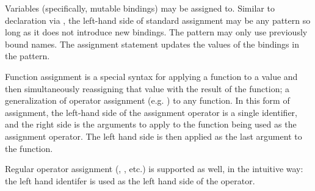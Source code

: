 Variables (specifically, mutable bindings) may be assigned to. Similar to
declaration via , the left-hand side of standard assignment may be
any pattern so long as it does not introduce new bindings. The pattern may only
use previously bound names. The assignment statement updates the values of the
bindings in the pattern.

Function assignment is a special syntax for applying a function to a value and
then simultaneously reassigning that value with the result of the function; a
generalization of operator assignment (e.g. \op{+=}) to any function. In this form
of assignment, the left-hand side of the assignment operator is a single identifier,
and the right side is the arguments to apply to the function being used as the
assignment operator. The left hand side is then applied as the last argument to
the function.

Regular operator assignment (\op{+=}, \op{-=}, etc.) is supported as well, in the
intuitive way: the left hand identifer is used as the left hand side of the operator.

\begin{bnf*}
     \\
     \\
     \\
     \\
     \\
     \\
    \bnfmore{
        \bnfts{|=}\bnfor
        \bnfts{\&=}\bnfor
        \bnfts{\textasciicircum=}\bnfor
        \bnfts{\textasciitilde=}\bnfor
        \bnfts{<\textasciitilde=}\bnfor
        \bnfts{\textasciitilde>=}
    }
\end{bnf*}

